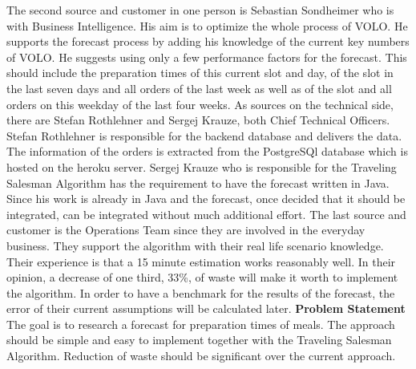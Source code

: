 The second source and customer in one person is Sebastian Sondheimer who is with Business Intelligence. His aim is to optimize the whole process of VOLO. He supports the forecast process by adding his knowledge of the current key numbers of VOLO. He suggests using only a few performance factors for the forecast. This should include the preparation times of this current slot and day, of the slot in the last seven days and all orders of the last week as well as of the slot and all orders on this weekday of the last four weeks.\newline
As sources on the technical side, there are Stefan Rothlehner and Sergej Krauze, both Chief Technical Officers. Stefan Rothlehner is responsible for the backend database and delivers the data. The information of the orders is extracted from the PostgreSQl database which is hosted on the heroku server. Sergej Krauze who is responsible for the Traveling Salesman Algorithm has the requirement to have the forecast written in Java. Since his work is already in Java and the forecast, once decided that it should be integrated, can be integrated without much additional effort.\newline
The last source and customer is the Operations Team since they are involved in the everyday business. They support the algorithm with their real life scenario knowledge. Their experience is that a 15 minute estimation works reasonably well. In their opinion, a decrease of one third, 33\%, of waste will make it worth to implement the algorithm. In order to have a benchmark for the results of the forecast, the error of their current assumptions will be calculated later.
\newline\newline\textbf{Problem Statement}\newline
The goal is to research a forecast for preparation times of meals. The approach should be simple and easy to implement together with the Traveling Salesman Algorithm. Reduction of waste should be significant over the current approach.
